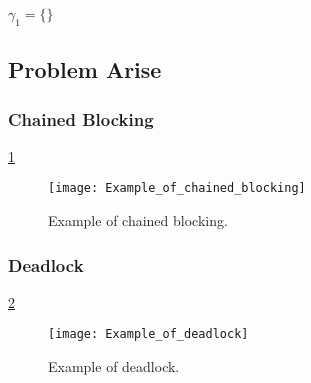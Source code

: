 $ \gamma_{1}=\{\} $

\subsection{Problem Arise}


\subsubsection{Chained Blocking}

\ref{fig:Example_of_chained_blocking}
\begin{figure}[h]
    \centering
    \texttt{[image: Example\_of\_chained\_blocking]}
    \caption{Example of chained blocking.\cite{b5}}
    \label{fig:Example_of_chained_blocking}
\end{figure}

\subsubsection{Deadlock}

\ref{fig:Example_of_deadlock}
\begin{figure}[h]
    \centering
    \texttt{[image: Example\_of\_deadlock]}
    \caption{Example of deadlock.\cite{b5}}
    \label{fig:Example_of_deadlock}
\end{figure}

















